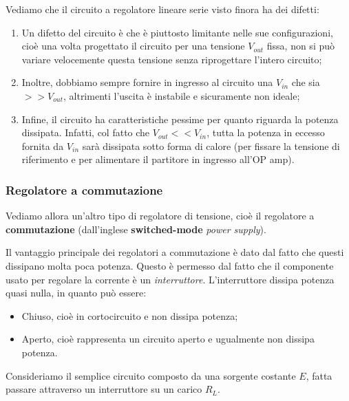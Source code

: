 \documentclass[a4paper,11pt]{article}
\begin{document}
\par\smallskip

Vediamo che il circuito a regolatore lineare serie visto finora ha dei difetti:
\begin{enumerate}
	\item Un difetto del circuito  è che è piuttosto limitante nelle sue configurazioni, cioè una volta progettato il circuito per una tensione $V_{out}$ fissa, non si può variare velocemente questa tensione senza riprogettare l'intero circuito;
	\item Inoltre, dobbiamo sempre fornire in ingresso al circuito una $V_{in}$ che sia $>> V_{out}$, altrimenti l'uscita è instabile e sicuramente non ideale;
	\item Infine, il circuito ha caratteristiche pessime per quanto riguarda la potenza dissipata. Infatti, col fatto che $V_{out} << V_{in}$, tutta la potenza in eccesso fornita da $V_{in}$ sarà dissipata sotto forma di calore (per fissare la tensione di riferimento e per alimentare il partitore in ingresso all'OP amp).
\end{enumerate}

\subsubsection{Regolatore a commutazione}
Vediamo allora un'altro tipo di regolatore di tensione, cioè il regolatore a \textbf{commutazione} (dall'inglese \textbf{switched-mode} \textit{power supply}).

Il vantaggio principale dei regolatori a commutazione è dato dal fatto che questi dissipano molta poca potenza. Questo è permesso dal fatto che il componente usato per regolare la corrente è un \textit{interruttore}. L'interruttore dissipa potenza quasi nulla, in quanto può essere:
\begin{itemize}
	\item Chiuso, cioè in cortocircuito e non dissipa potenza;
	\item Aperto, cioè rappresenta un circuito aperto e ugualmente non dissipa potenza.
\end{itemize}

\newpage

Consideriamo il semplice circuito composto da una sorgente costante $E$, fatta passare attraverso un interruttore su un carico $R_L$.
\begin{center}
\end{center}
\end{document}
